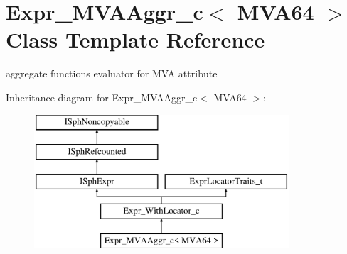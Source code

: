 \hypertarget{classExpr__MVAAggr__c}{\section{Expr\-\_\-\-M\-V\-A\-Aggr\-\_\-c$<$ M\-V\-A64 $>$ Class Template Reference}
\label{classExpr__MVAAggr__c}
}


aggregate functions evaluator for M\-V\-A attribute  


Inheritance diagram for Expr\-\_\-\-M\-V\-A\-Aggr\-\_\-c$<$ M\-V\-A64 $>$\-:\begin{figure}[H]
\begin{center}
\leavevmode
\includegraphics[height=5.000000cm]{classExpr__MVAAggr__c}
\end{center}
\end{figure}
